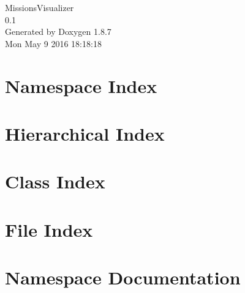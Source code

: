 \documentclass[twoside]{book}
\newcommand{\+}{\discretionary{\mbox{\scriptsize$\hookleftarrow$}}{}{}}
\newcommand{\clearemptydoublepage}{%
  \newpage{\pagestyle{empty}\cleardoublepage}%
}
\begin{document}
\hypersetup{pageanchor=false,
             bookmarks=true,
             bookmarksnumbered=true,
             pdfencoding=unicode
            }
\begin{titlepage}
\vspace*{7cm}
\begin{center}%
{\Large Missions\+Visualizer \\[1ex]\large 0.\+1 }\\
\vspace*{1cm}
{\large Generated by Doxygen 1.8.7}\\
\vspace*{0.5cm}
{\small Mon May 9 2016 18:18:18}\\
\end{center}
\end{titlepage}
\clearemptydoublepage
\tableofcontents
\clearemptydoublepage
{}
\hypersetup{pageanchor=true}

\chapter{Namespace Index}

\chapter{Hierarchical Index}

\chapter{Class Index}

\chapter{File Index}

\chapter{Namespace Documentation}

\end{document}
